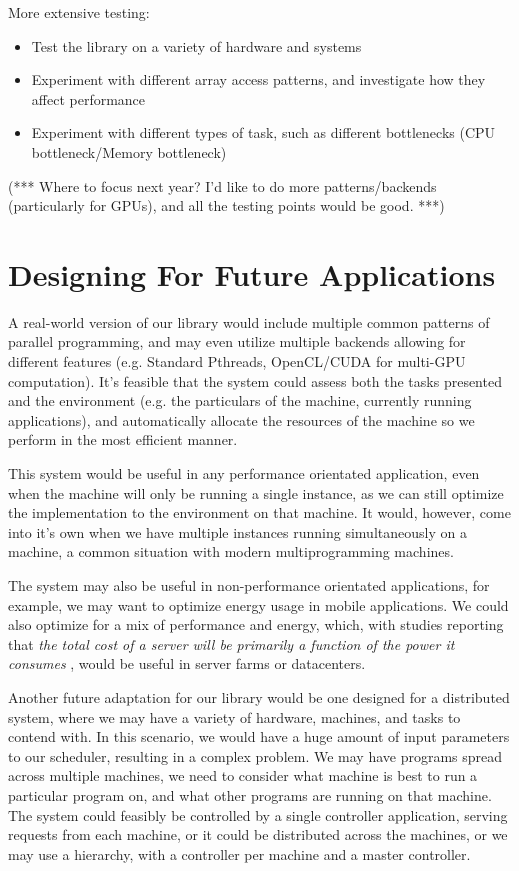 More extensive testing:

\begin{itemize}
	\item Test the library on a variety of hardware and systems
	\item Experiment with different array access patterns, and investigate how they affect performance
	\item Experiment with different types of task, such as different bottlenecks (CPU bottleneck/Memory bottleneck) 
\end{itemize}

(*** Where to focus next year? I'd like to do more patterns/backends (particularly for GPUs), and all the testing points would be good. ***)



\section{Designing For Future Applications}

A real-world version of our library would include multiple common patterns of parallel programming, and may even utilize multiple backends allowing for different features (e.g. Standard Pthreads, OpenCL/CUDA for multi-GPU computation). It's feasible that the system could assess both the tasks presented and the environment (e.g. the particulars of the machine, currently running applications), and automatically allocate the resources of the machine so we perform in the most efficient manner.

This system would be useful in any performance orientated application, even when the machine will only be running a single instance, as we can still optimize the implementation to the environment on that machine. It would, however, come into it's own when we have multiple instances running simultaneously on a machine, a common situation with modern multiprogramming machines.

The system may also be useful in non-performance orientated applications, for example, we may want to optimize energy usage in mobile applications. We could also optimize for a mix of performance and energy, which, with studies reporting that \textit{the total cost of a server will be primarily a function of the power it consumes} \cite{datacenters}, would be useful in server farms or datacenters.

Another future adaptation for our library would be one designed for a distributed system, where we may have a variety of hardware, machines, and tasks to contend with. In this scenario, we would have a huge amount of input parameters to our scheduler, resulting in a complex problem. We may have programs spread across multiple machines, we need to consider what machine is best to run a particular program on, and what other programs are running on that machine. The system could feasibly be controlled by a single controller application, serving requests from each machine, or it could be distributed across the machines, or we may use a hierarchy, with a controller per machine and a master controller. 